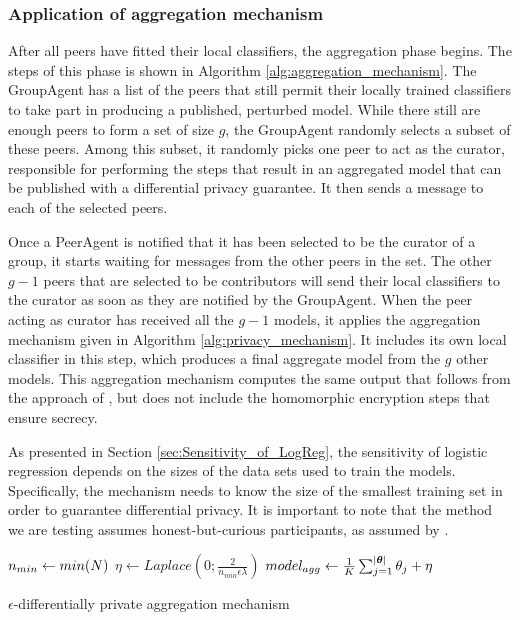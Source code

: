 \subsubsection{Application of aggregation mechanism}

After all peers have fitted their local classifiers, the aggregation phase begins. The steps of this phase is shown in Algorithm \ref{alg:aggregation_mechanism}. The GroupAgent has a list of the peers that still permit their locally trained classifiers to take part in producing a published, perturbed model. While there still are enough peers to form a set of size $g$, the GroupAgent randomly selects a subset of these peers. Among this subset, it randomly picks one peer to act as the curator, responsible for performing the steps that result in an aggregated model that can be published with a differential privacy guarantee. It then sends a message to each of the selected peers.

Once a PeerAgent is notified that it has been selected to be the curator of a group, it starts waiting for messages from the other peers in the set. The other $g-1$ peers that are selected to be contributors will send their local classifiers to the curator as soon as they are notified by the GroupAgent. When the peer acting as curator has received all the $g-1$ models, it applies the aggregation mechanism given in Algorithm \ref{alg:privacy_mechanism}. It includes its own local classifier in this step, which produces a final aggregate model from the $g$ other models. This aggregation mechanism computes the same output that follows from the approach of \cite{pathak2010diffprivhomo}, but does not include the homomorphic encryption steps that ensure secrecy.

As presented in Section \ref{sec:Sensitivity_of_LogReg}, the sensitivity of logistic regression depends on the sizes of the data sets used to train the models. Specifically, the mechanism needs to know the size of the smallest training set in order to guarantee differential privacy. It is important to note that the method we are testing assumes honest-but-curious participants, as assumed by \cite{pathak2010diffprivhomo}.

\begin{algorithm}[H]
	
	$n_{min} \leftarrow min(\boldmath{N})$\;
	$\eta \leftarrow Laplace(0; \frac{2}{n_{min}\epsilon\lambda})$\;
	$model_{agg} \leftarrow \frac{1}{K}\sum_{j=1}^{|\boldsymbol{\theta}|} \boldmath{\theta_j} + \boldmath{\eta}$\;
	
	\caption{$\epsilon$-differentially private aggregation mechanism}
	\label{alg:privacy_mechanism}
\end{algorithm}


